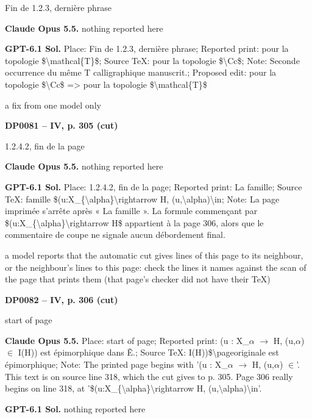 Fin de 1.2.3, dernière phrase\par
\textbf{Claude Opus 5.5.} nothing reported here\par
\textbf{GPT-6.1 Sol.} Place: Fin de 1.2.3, dernière phrase; Reported print: pour la topologie \$\textbackslash{}mathcal\{T\}\$; Source TeX: pour la topologie \$\textbackslash{}Cc\$; Note: Seconde occurrence du même T calligraphique manuscrit.; Proposed edit: pour la topologie \$\textbackslash{}Cc\$ =\allowbreak > pour la topologie \$\textbackslash{}mathcal\{T\}\$\par
a fix from one model only\par
\par\noindent\hypertarget{DP0081}{}\textbf{DP0081 -- IV, p. 305 (cut)}\par
1.2.4.2, fin de la page\par
\textbf{Claude Opus 5.5.} nothing reported here\par
\textbf{GPT-6.1 Sol.} Place: 1.2.4.2, fin de la page; Reported print: La famille; Source TeX: famille \$(u:X\_\{\textbackslash{}alpha\}\textbackslash{}rightarrow H, (u,\textbackslash{}alpha)\textbackslash{}in; Note: La page imprimée s'arrête après « La famille ». La formule commençant par \$(u:X\_\{\textbackslash{}alpha\}\textbackslash{}rightarrow H\$ appartient à la page 306, alors que le commentaire de coupe ne signale aucun débordement final.\par
a model reports that the automatic cut gives lines of this page to its neighbour, or the neighbour's lines to this page: check the lines it names against the scan of the page that prints them (that page's checker did not have their TeX)\par
\par\noindent\hypertarget{DP0082}{}\textbf{DP0082 -- IV, p. 306 (cut)}\par
start of page\par
\textbf{Claude Opus 5.5.} Place: start of page; Reported print: (u : X\_\ensuremath{\alpha} \ensuremath{\longrightarrow} H, (u,\ensuremath{\alpha}) \ensuremath{\in} I(H)) est épimorphique dans Ẽ.; Source TeX: I(H))\$\textbackslash{}pageoriginale est épimorphique; Note: The printed page begins with '(u : X\_\ensuremath{\alpha} \ensuremath{\to} H, (u,\ensuremath{\alpha}) \ensuremath{\in}'. This text is on source line 318, which the cut gives to p. 305. Page 306 really begins on line 318, at '\$(u:X\_\{\textbackslash{}alpha\}\textbackslash{}rightarrow H, (u,\textbackslash{}alpha)\textbackslash{}in'.\par
\textbf{GPT-6.1 Sol.} nothing reported here\par
